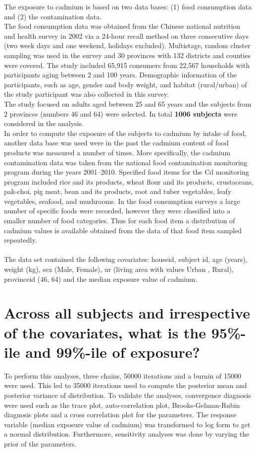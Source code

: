 \documentclass[11pt]{article}
\begin{document}
The exposure to cadmium is based on two data bases: (1) food consumption data and (2) the contamination data.\\
The food consumption data was obtained from the Chinese national nutrition and health survey in 2002 via a 24-hour recall method on three consecutive days (two week days and one weekend, holidays excluded). Multistage, random cluster sampling was used in the survey and 30 provinces with 132 districts and counties were covered. The study included 65,915 consumers from 22,567 households with participants aging between 2 and 100 years. Demographic information of the participants, such as age, gender and body weight, and habitat (rural/urban) of the study participant was also collected in this survey.\\
The study focused on adults aged between 25 and 65 years and  the subjects from 2 provinces (numbers 46 and 64) were selected. In total \textbf{ 1006 subjects} were considered in the analysis.\\
In order to compute the exposure of the subjects to cadmium by intake of food, another data base was used were in the past the cadmium content of food products was measured a number of times. More specifically, the cadmium contamination data was taken from the national food contamination monitoring program during the years 2001–2010. Specified food items for the Cd monitoring program included rice and its products, wheat flour and its products, crustaceans, pak-choi, pig meat, bean and its products, root and tuber vegetables, leafy vegetables, seafood, and mushrooms. In the food consumption surveys a large number of specific foods were recorded, however they were classified into a smaller number of food categories. Thus for each food item a distribution of cadmium values is available obtained from the data of that food item sampled repeatedly.\\ \\
The data set contained the following covariates: houseid, subject id, age (years), weight (kg), sex (Male, Female), ur (living area with values Urban , Rural), provinceid (46, 64) and the median exposure value of cadmium.\\

\newpage
\section{Across all subjects and irrespective of the covariates, what is the 95\%-ile and 99\%-ile of exposure?}
To perform this analyses, three chains, 50000 iterations and a burnin of 15000 were used. This led to 35000 iterations used to compute the posterior mean and posterior variance of distribution. To validate the analyses, convergence diagnosis were used such as the trace plot, auto-correlation plot, Brooks-Gelman-Rubin diagnosis plots and a cross correlation plot for the parameters. The response variable (median exposure value of cadmium) was transformed to log form to get a normal distribution. Furthermore,  sensitivity analyses was done by varying the prior of the parameters.
\end{document}
